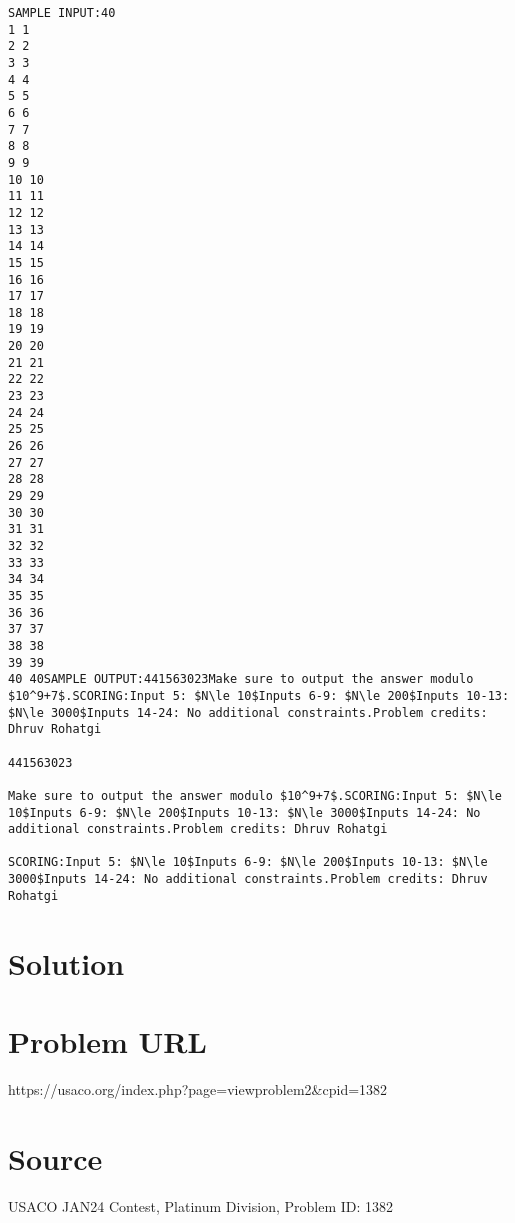 \documentclass[12pt]{article}
\begin{document}
\begin{verbatim}
SAMPLE INPUT:40
1 1
2 2
3 3
4 4
5 5
6 6
7 7
8 8
9 9
10 10
11 11
12 12
13 13
14 14
15 15
16 16
17 17
18 18
19 19
20 20
21 21
22 22
23 23
24 24
25 25
26 26
27 27
28 28
29 29
30 30
31 31
32 32
33 33
34 34
35 35
36 36
37 37
38 38
39 39
40 40SAMPLE OUTPUT:441563023Make sure to output the answer modulo $10^9+7$.SCORING:Input 5: $N\le 10$Inputs 6-9: $N\le 200$Inputs 10-13: $N\le 3000$Inputs 14-24: No additional constraints.Problem credits: Dhruv Rohatgi

441563023

Make sure to output the answer modulo $10^9+7$.SCORING:Input 5: $N\le 10$Inputs 6-9: $N\le 200$Inputs 10-13: $N\le 3000$Inputs 14-24: No additional constraints.Problem credits: Dhruv Rohatgi

SCORING:Input 5: $N\le 10$Inputs 6-9: $N\le 200$Inputs 10-13: $N\le 3000$Inputs 14-24: No additional constraints.Problem credits: Dhruv Rohatgi
\end{verbatim}

\section*{Solution}


\section*{Problem URL}
https://usaco.org/index.php?page=viewproblem2&cpid=1382

\section*{Source}
USACO JAN24 Contest, Platinum Division, Problem ID: 1382
\end{document}
